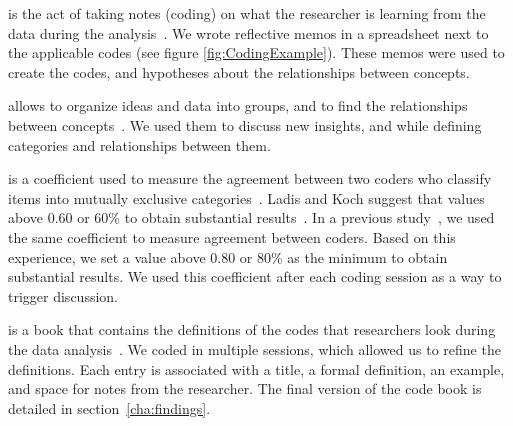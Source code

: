 \documentclass{sig-alternate-05-2015}
\begin{document}
	\begin{description}
      \setlength{\itemsep}{3pt}
      \setlength{\parskip}{0pt}
      \setlength{\parsep}{0pt}
		\item[Memoing] is the act of taking notes (coding) on what the researcher is learning from the data during the analysis~\cite{Groenewald2008}.%
We wrote reflective memos in a spreadsheet next to the applicable codes (see figure \ref{fig:CodingExample}).
These memos were used to create the codes, and hypotheses about the relationships between concepts.

		\item[Affinity diagrams] allows to organize ideas and data into groups, and to find the relationships between concepts~\cite{Scupin1997}.
		We used them to discuss new insights, and while defining categories and relationships between them.

		\item[Inter-rater agreement \textit{Cohen Kappa}] is a coefficient used to measure the agreement between two coders who classify items into mutually exclusive categories~\cite{Stemler2004}.
		Ladis and Koch suggest that values above 0.60 or 60\% to obtain substantial results~\cite{Landis1977}.
		In a previous study~\cite{Gomez2013}, we used the same coefficient to measure agreement between coders.
		Based on this experience, we set a value above 0.80 or 80\% as the minimum to obtain substantial results.
		We used this coefficient after each coding session as a way to trigger discussion.

		\item[Code book] is a book that contains the definitions of the codes that researchers look during the data analysis~\cite{MacQueen1998}.
		We coded in multiple sessions, which allowed us to refine the definitions.
		Each entry is associated with a title, a formal definition, an example, and space for notes from the researcher.
		The final version of the code book is detailed in section~\ref{cha:findings}.
	\end{description}

\end{document}
